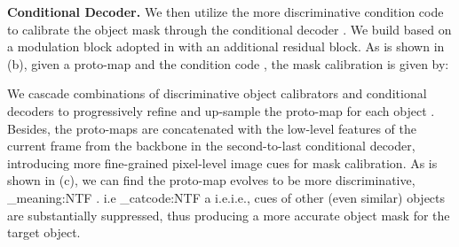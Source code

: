\documentclass[sigconf]{acmart}
\makeatletter
\newcommand\latinabbrev[1]{
	\peek_meaning:NTF . {#1\@}{ \peek_catcode:NTF a {#1.\@ }{#1.\@}}}
\def\ie{\latinabbrev{i.e}}
\makeatother
\begin{document}
\noindent\textbf{Conditional Decoder.}
\label{sec:method/relational_modulation_network/intra_object_interaction}
We then utilize the more discriminative condition code  to calibrate the object mask  through the conditional decoder .
We build  based on a modulation block adopted in \cite{yang2020collaborative,yang2020gated} with an additional residual block. 
As is shown in \fig{\ref{fig:multi-object-discrimination}} (b), given a proto-map  and the condition code , the mask calibration is given by:
        

We cascade  combinations of discriminative object calibrators and conditional decoders to progressively refine and up-sample the proto-map  for each object . Besides, the proto-maps are concatenated with the low-level features of the current frame from the backbone in the second-to-last conditional decoder, introducing more fine-grained pixel-level image cues for mask calibration. As is shown in \fig{\ref{fig:multi-object-discrimination}} (c), we can find the proto-map evolves to be more discriminative, \ie, cues of other (even similar) objects are substantially suppressed, thus producing a more accurate object mask for the target object.
\end{document}
